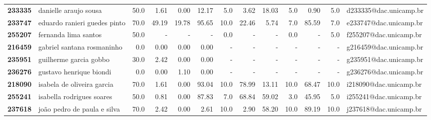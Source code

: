 \documentclass[11pt]{article}
\begin{document}
\begin{center}
\begin{landscape}
\begin{longtable}{llrrrrrrrrrrl}
\textbf{233335} &                 danielle araujo sousa &                  50.0 &        1.61 &        0.00 &       12.17 &                      5.0 &        3.62 &       18.03 &                        5.0 &        0.90 &                      5.0 &  d233335@dac.unicamp.br \\
\textbf{233747} &          eduardo ranieri guedes pinto &                  70.0 &       49.19 &       19.78 &       95.65 &                     10.0 &       22.46 &        5.74 &                        7.0 &       85.59 &                      7.0 &  e233747@dac.unicamp.br \\
\textbf{255207} &                  fernanda lima santos &                  50.0 &           - &           - &           - &                      0.0 &           - &           - &                        0.0 &           - &                      5.0 &  f255207@dac.unicamp.br \\
\textbf{216459} &            gabriel santana rosmaninho &                   0.0 &        0.00 &        0.00 &        0.00 &                        - &           - &           - &                          - &           - &                        - &  g216459@dac.unicamp.br \\
\textbf{235951} &                guilherme garcia gobbo &                  30.0 &        2.42 &        0.00 &        0.00 &                        - &           - &           - &                          - &           - &                        - &  g235951@dac.unicamp.br \\
\textbf{236276} &               gustavo henrique biondi &                   0.0 &        0.00 &        1.10 &        0.00 &                        - &           - &           - &                          - &           - &                        - &  g236276@dac.unicamp.br \\
\textbf{218090} &            isabela de oliveira garcia &                  70.0 &        1.61 &        0.00 &       93.04 &                     10.0 &       78.99 &       13.11 &                       10.0 &       68.47 &                     10.0 &  i218090@dac.unicamp.br \\
\textbf{255241} &             isabella rodrigues soares &                  50.0 &        0.81 &        0.00 &       87.83 &                      7.0 &       68.84 &       59.02 &                        3.0 &       45.95 &                      5.0 &  i255241@dac.unicamp.br \\
\textbf{237618} &           joão pedro de paula e silva &                  70.0 &        2.42 &        0.00 &        2.61 &                     10.0 &        2.90 &       58.20 &                       10.0 &       89.19 &                     10.0 &  j237618@dac.unicamp.br \\

\end{longtable}
\end{landscape}
\end{center}
\end{document}
